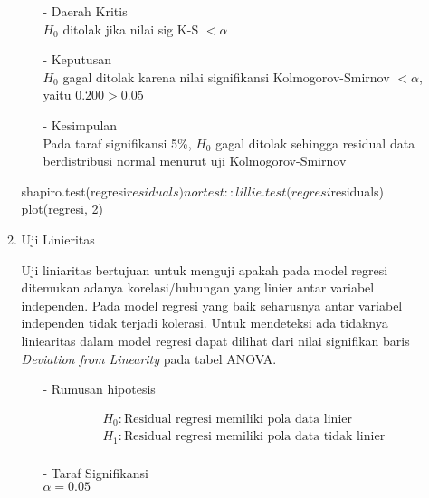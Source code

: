 \begin{enumerate}
\begin{enumerate}
\begin{test}
{\begin{enumerate}
            \item[-] Daerah Kritis \\
            $H_0$ ditolak jika nilai sig K-S $< \alpha$
        
            \item[-] Keputusan \\
            $H_0$ gagal ditolak karena nilai signifikansi Kolmogorov-Smirnov $< \alpha$, yaitu $0.200 > 0.05$
        
            \item[-] Kesimpulan \\
            Pada taraf signifikansi 5\%, $H_0$ gagal ditolak sehingga residual data berdistribusi normal menurut uji Kolmogorov-Smirnov
        \end{enumerate}
        }
shapiro.test(regresi$residuals)
nortest::lillie.test(regresi$residuals)
plot(regresi, 2)
        \end{test}

    \item Uji Linieritas \\
    \begin{sloppypar}
    Uji liniaritas bertujuan untuk menguji apakah pada model regresi ditemukan adanya korelasi/hubungan yang linier antar variabel independen. Pada model regresi yang baik seharusnya antar variabel independen tidak terjadi kolerasi. Untuk mendeteksi ada tidaknya liniearitas dalam model regresi dapat dilihat dari nilai signifikan baris \textit{Deviation from Linearity} pada tabel ANOVA.
    \end{sloppypar}
        \begin{test}{
            \begin{enumerate}
            \item[-] Rumusan hipotesis \\
            \begin{fleqn}[\parindent]
                \begin{equation*}
                \begin{split}
                &H_0 : \text{Residual regresi memiliki pola data linier} \\ 
                &H_1 : \text{Residual regresi memiliki pola data tidak linier} \\
                \end{split}
                \end{equation*}
            \end{fleqn}
        
            \item[-] Taraf Signifikansi \\
            $\alpha = 0.05$
        

\end{enumerate}}
\end{test}
\end{enumerate}
\end{enumerate}
